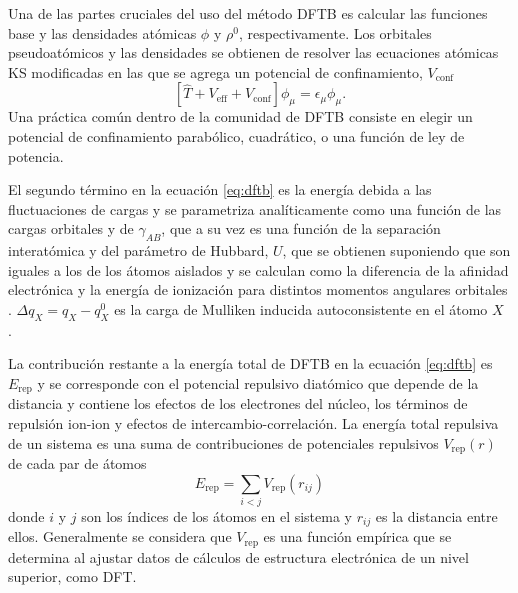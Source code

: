 Una de las partes cruciales del uso del método DFTB es calcular las funciones 
base y las densidades atómicas $\phi$ y $\rho^0$, respectivamente. Los orbitales
pseudoatómicos y las densidades se obtienen de resolver las ecuaciones atómicas KS 
modificadas en las que se agrega un potencial de confinamiento, $V_{\text{conf}}$
\begin{equation}\label{eq:dft}
    \left[\hat{T}+V_{\text{eff}}+V_{\text{conf}}\right]\phi_\mu=\epsilon_\mu\phi_\mu.
\end{equation}
Una práctica común dentro de la comunidad de DFTB consiste en elegir un potencial
de confinamiento parabólico, cuadrático, o una función de ley de potencia.

El segundo término en la ecuación \ref{eq:dftb} es la energía debida a las 
fluctuaciones de cargas y se parametriza analíticamente como una función de las
cargas orbitales y de $\gamma_{AB}$, que a su vez es una función de la separación 
interatómica y del parámetro de Hubbard, $U$, que se obtienen suponiendo que son 
iguales a los de los átomos aislados y se calculan como la diferencia de la 
afinidad electrónica y la energía de ionización para distintos momentos angulares 
orbitales \cite{elstner1998b}. $\Delta q_X = q_X - q_X^0$ es la carga de Mulliken 
inducida autoconsistente en el átomo $X$ \cite{elstner1998}.

La contribución restante a la energía total de DFTB en la ecuación \ref{eq:dftb}
es $E_{\text{rep}}$ y se corresponde con el potencial repulsivo diatómico que 
depende de la distancia y contiene los efectos de los electrones del núcleo, los 
términos de repulsión ion-ion y efectos de intercambio-correlación. 
La energía total repulsiva de un sistema es una suma de contribuciones de 
potenciales repulsivos $V_{\text{rep}}(r)$ de cada par de átomos
\begin{equation}\label{eq:rep}
    E_{\text{rep}}=\sum_{i<j} V_{\text{rep}}(r_{ij})
\end{equation}
donde $i$ y $j$ son los índices de los átomos en el sistema y $r_{ij}$ es la 
distancia entre ellos. Generalmente se considera que $V_{\text{rep}}$ es una
función empírica que se determina al ajustar datos de cálculos de estructura 
electrónica de un nivel superior, como DFT.
